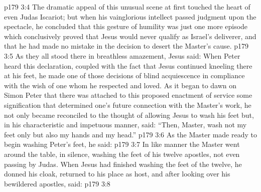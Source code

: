 \vs p179 3:4 The dramatic appeal of this unusual scene at first touched the heart of even Judas Iscariot; but when his vainglorious intellect passed judgment upon the spectacle, he concluded that this gesture of humility was just one more episode which conclusively proved that Jesus would never qualify as Israel’s deliverer, and that he had made no mistake in the decision to desert the Master’s cause.
\vs p179 3:5 As they all stood there in breathless amazement, Jesus said:  When Peter heard this declaration, coupled with the fact that Jesus continued kneeling there at his feet, he made one of those decisions of blind acquiescence in compliance with the wish of one whom he respected and loved. As it began to dawn on Simon Peter that there was attached to this proposed enactment of service some signification that determined one’s future connection with the Master’s work, he not only became reconciled to the thought of allowing Jesus to wash his feet but, in his characteristic and impetuous manner, said: “Then, Master, wash not my feet only but also my hands and my head.”
\vs p179 3:6 As the Master made ready to begin washing Peter’s feet, he said: 
\vs p179 3:7 In like manner the Master went around the table, in silence, washing the feet of his twelve apostles, not even passing by Judas. When Jesus had finished washing the feet of the twelve, he donned his cloak, returned to his place as host, and after looking over his bewildered apostles, said:
\vs p179 3:8 \pc {}
